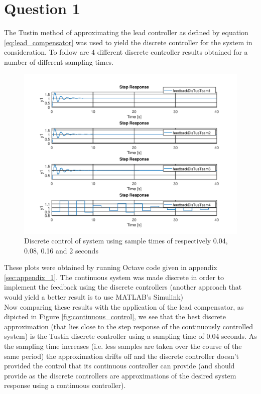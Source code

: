 \documentclass[a4paper, 12pt]{article}
\begin{document}
\section{Question 1} %
\label{sec:question_1}
The Tustin method of approximating the lead controller as defined by equation \eqref{eq:lead_compensator} was used to yield the discrete controller for the system in consideration. To follow are 4 different discrete controller results obtained for a number of different sampling times.

\begin{figure}[H]
  \centering
  \includegraphics[width=\textwidth]{img/discrete_controllers.png}
  \caption{Discrete control of system using sample times of respectively 0.04, 0.08, 0.16 and 2 seconds}
  \label{fig:discrete_controllers}
\end{figure}

These plots were obtained by running Octave code given in
appendix \ref{sec:appendix_1}. The continuous system was made discrete in order
to implement the feedback using the discrete controllers (another approach that
would yield a better result is to use MATLAB's Simulink)\\

Now comparing these results with the application of the lead compensator, as
dipicted in Figure \ref{fig:continuous_control}, we see that the best discrete
approximation (that lies close to the step response of the continuously
controlled system) is the Tustin discrete controller using a sampling time of
$0.04$ seconds. As the sampling time increases (i.e. less samples are taken
over the course of the same period) the approximation drifts off and the
discrete controller doesn't provided the control that its continuous controller
can provide (and should provide as the discrete controllers are approximations
of the desired system response using a continuous controller).\\
\end{document}
